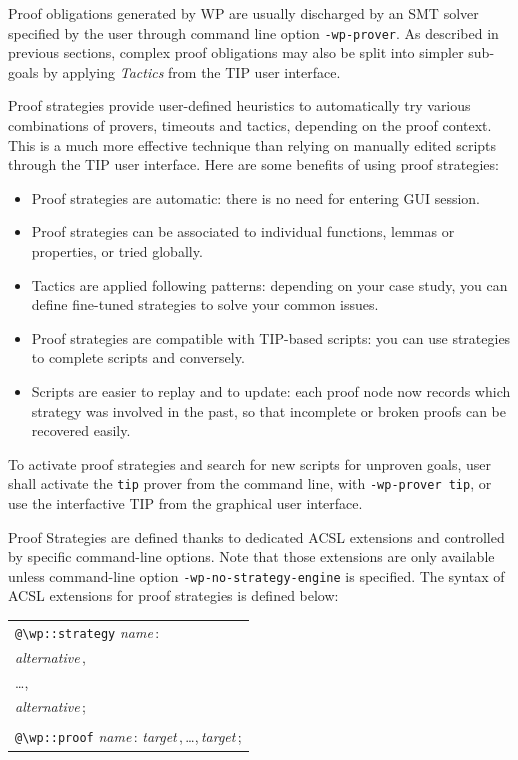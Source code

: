 Proof obligations generated by \textsf{WP} are usually discharged by an
\textsf{SMT} solver specified by the user through command line option
\verb$-wp-prover$. As described in previous sections, complex proof obligations
may also be split into simpler sub-goals by applying \emph{Tactics} from the
\textsf{TIP} user interface.

Proof strategies provide user-defined heuristics to automatically try various
combinations of provers, timeouts and tactics, depending on the proof
context. This is a much more effective technique than relying on manually edited
scripts through the \textsf{TIP} user interface. Here are some benefits of using
proof strategies:
\begin{itemize}
\item Proof strategies are automatic: there is no need for entering GUI session.
\item Proof strategies can be associated to individual functions, lemmas or properties,
  or tried globally.
\item Tactics are applied following patterns: depending on your case study, you can
  define fine-tuned strategies to solve your common issues.
\item Proof strategies are compatible with TIP-based scripts: you can use
  strategies to complete scripts and conversely.
\item Scripts are easier to replay and to update: each proof node now records
  which strategy was involved in the past, so that incomplete or broken proofs
  can be recovered easily.
\end{itemize}

To activate proof strategies and search for new scripts for unproven goals, user
shall activate the \verb+tip+ prover from the command line, with
\verb+-wp-prover tip+, or use the interfactive \textsf{TIP} from the graphical
user interface.

Proof Strategies are defined thanks to dedicated ACSL extensions and controlled
by specific command-line options. Note that those extensions are only available
unless command-line option \verb+-wp-no-strategy-engine+ is specified.
The syntax of ACSL extensions for proof strategies is defined below:

\newcommand{\pdots}{\,,\,\ldots,\,}

\begin{center}
  \begin{tabular}{l}
    \verb+@\wp::strategy+ \textit{name}\,: \\
    \quad\quad\textit{alternative}\,, \\
    \quad\quad\ldots, \\
    \quad\quad\textit{alternative}\,; \\
    \\
    \verb+@\wp::proof+ \textit{name}\,: \textit{target}\pdots\textit{target}\,;
  \end{tabular}
\end{center}

